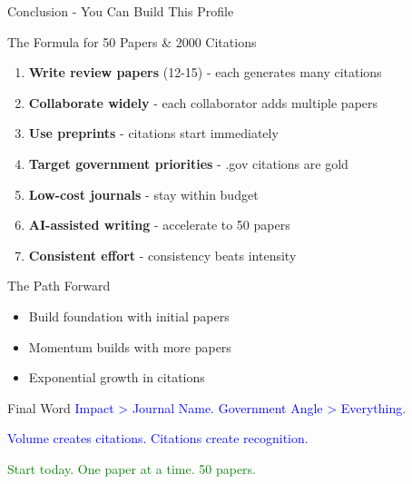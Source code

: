 \documentclass[11pt]{beamer}
\begin{document}
	\begin{frame}{Conclusion - You Can Build This Profile}
		\scriptsize
		\begin{block}{The Formula for 50 Papers \& 2000 Citations}
			\begin{enumerate}
				\item \textbf{Write review papers} (12-15) - each generates many citations
				\item \textbf{Collaborate widely} - each collaborator adds multiple papers
				\item \textbf{Use preprints} - citations start immediately
				\item \textbf{Target government priorities} - .gov citations are gold
				\item \textbf{Low-cost journals} - stay within budget
				\item \textbf{AI-assisted writing} - accelerate to 50 papers
				\item \textbf{Consistent effort} - consistency beats intensity
			\end{enumerate}
		\end{block}
		\begin{block}{The Path Forward}
			\begin{itemize}
				\item Build foundation with initial papers
				\item Momentum builds with more papers
				\item Exponential growth in citations
			\end{itemize}
		\end{block}
		\begin{block}{Final Word}
			\textcolor{blue}{Impact > Journal Name. Government Angle > Everything.}
			
			\textcolor{blue}{Volume creates citations. Citations create recognition.}
			
			\textcolor{green}{Start today. One paper at a time. 50 papers.}
		\end{block}
	\end{frame}
	
\end{document}
